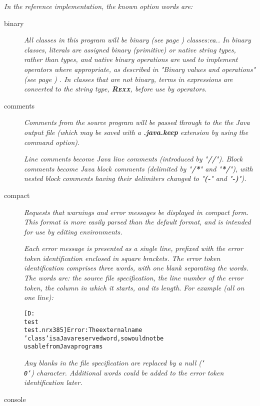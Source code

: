 \emph{In the reference implementation, the known option words are:}
\begin{description}
\item[binary]
\emph{All classes in this program will be  binary (see page \pageref{refbincla}) 
classes:ea..
In binary classes, literals are assigned binary (primitive) or native
string types, rather than \nr{} types, and native binary operations
are used to implement operators where appropriate, as described in
 "\emph{Binary values and operations}" (see page \pageref{refbinary}) .
In classes that are not binary, terms in expressions are converted to
the \nr{} string type, \textbf{R\textsc{exx}}, before use by operators.}
\item[comments]

\emph{Comments from the \nr{} source program will be passed through to the
the Java output file (which may be saved with a \textbf{.java.keep}
extension by using the  command option).}
 
\emph{Line comments become Java line comments (introduced by
"\textbf{//}").
Block comments become Java block comments (delimited by
"\textbf{/*}" and "\textbf{*/}"), with nested block
comments having their delimiters changed to "\textbf{(-}" and
"\textbf{-)}").}
\item[compact]

\emph{Requests that warnings and error messages be displayed in compact
form.  This format is more easily parsed than the default format, and
is intended for use by editing environments.}
 
\emph{Each error message is presented as a single line, prefixed with the
error token identification enclosed in square brackets.
The error token identification comprises three words, with one blank
separating the words.  The words are: the source file specification, the
line number of the error token, the column in which it starts, and its
length.  For example (all on one line):}
\begin{alltt}
[D:\\test\\test.nrx 3 8 5] Error: The external name
'class' is a Java reserved word, so would not be
usable from Java programs
\end{alltt}
\emph{Any blanks in the file specification are replaced by a null
(\texttt{'\\0'}) character.  Additional words could be added to the error
token identification later.}
\item[console]


\end{description}
